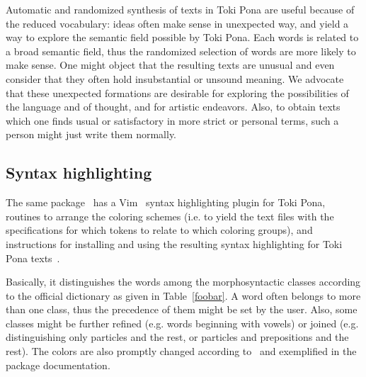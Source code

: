 \documentclass{article}
\begin{document}
Automatic and randomized synthesis of texts in Toki Pona are
useful because of the reduced vocabulary: ideas often make
sense in unexpected way, and yield a way to 
explore the semantic field possible by Toki Pona.
Each words is related to a broad semantic field,
thus the randomized selection of words are more likely
to make sense.
One might object that the resulting texts are unusual 
and even consider that they often hold insubstantial or unsound meaning.
We advocate that these unexpected formations are desirable
for exploring the possibilities of the language and of thought,
and for artistic endeavors.
Also, to obtain texts which one finds usual or satisfactory
in more strict or personal terms, such a person might just write
them normally.



\clearpage
\subsection{Syntax highlighting}\label{shigh}
The same package~\cite{tokipona}
has a Vim~\cite{vim} syntax highlighting plugin
for Toki Pona,
routines to arrange the coloring schemes
(i.e. to yield the text files with the specifications for which tokens
to relate to which coloring groups),
and instructions for installing and using
the resulting syntax highlighting for Toki Pona texts~\cite{tokipona}.

Basically, it distinguishes the words among the morphosyntactic
classes according to the official dictionary as given in
Table~\ref{foobar}.
A word often belongs to more than one class,
thus the precedence of them might be set by the user.
Also, some classes might be further refined (e.g. words beginning with
vowels) or joined (e.g. distinguishing only particles and the rest,
or particles and prepositions and the rest).
The colors are also promptly changed according to~\cite{vimArt}
and exemplified in the package documentation.
\end{document}
